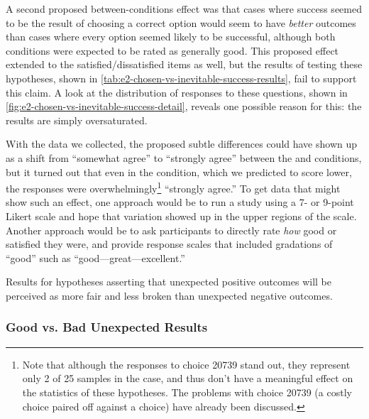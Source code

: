 A second proposed between-conditions effect was that cases where success seemed to be the result of choosing a correct option would seem to have \emph{better} outcomes than cases where every option seemed likely to be successful, although both conditions were expected to be rated as generally good.
%
This proposed effect extended to the satisfied/dissatisfied items as well, but the results of testing these hypotheses, shown in \cref{tab:e2-chosen-vs-inevitable-success-results}, fail to support this claim.
%
A look at the distribution of responses to these questions, shown in \cref{fig:e2-chosen-vs-inevitable-success-detail}, reveals one possible reason for this: the results are simply oversaturated.


With the data we collected, the proposed subtle differences could have shown up as a shift from ``somewhat agree'' to ``strongly agree'' between the \exps{} and \obvsm{} conditions, but it turned out that even in the \exps{} condition, which we predicted to score lower, the responses were overwhelmingly\footnote{%
Note that although the responses to choice 20739 stand out, they represent only 2 of 25 samples in the \obvsm{} case, and thus don't have a meaningful effect on the statistics of these hypotheses.
%
The problems with choice 20739 (a costly choice paired off against a  choice) have already been discussed.%
}\hspace{0.1em} ``strongly agree.''
%
To get data that might show such an effect, one approach would be to run a study using a 7- or 9-point Likert scale and hope that variation showed up in the upper regions of the scale.
%
Another approach would be to ask participants to directly rate \emph{how} good or satisfied they were, and provide response scales that included gradations of ``good'' such as ``good---great---excellent.''


\begin{table}[!t]
\centering
\bgroup
\def\arraystretch{1.3}
\setlength{\tabcolsep}{0.6em}

\egroup
\caption[Retrospective good vs\@. bad unexpected results]{Results for hypotheses asserting that unexpected positive outcomes will be perceived as more fair and less broken than unexpected negative outcomes.}
  \label{tab:e2-good-vs-bad-unexpected-results}
\end{table}

\subsubsection{Good vs\@. Bad Unexpected Results}

